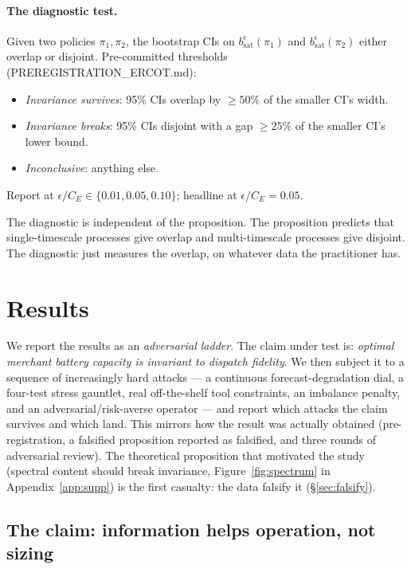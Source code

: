 \documentclass[11pt]{article}
\begin{document}
\paragraph{The diagnostic test.} Given two policies $\pi_1, \pi_2$, the bootstrap CIs on $b_{\mathrm{sat}}^\epsilon(\pi_1)$ and $b_{\mathrm{sat}}^\epsilon(\pi_2)$ either overlap or disjoint. Pre-committed thresholds (PREREGISTRATION\_ERCOT.md):

\begin{itemize}
\item \emph{Invariance survives}: 95\% CIs overlap by $\geq 50\%$ of the smaller CI's width.
\item \emph{Invariance breaks}: 95\% CIs disjoint with a gap $\geq 25\%$ of the smaller CI's lower bound.
\item \emph{Inconclusive}: anything else.
\end{itemize}

Report at $\epsilon / C_E \in \{0.01, 0.05, 0.10\}$; headline at $\epsilon / C_E = 0.05$.

The diagnostic is independent of the proposition. The proposition predicts that single-timescale processes give overlap and multi-timescale processes give disjoint. The diagnostic just measures the overlap, on whatever data the practitioner has.

\section{Results}\label{sec:results}

We report the results as an \emph{adversarial ladder}. The claim under
test is: \emph{optimal merchant battery capacity is invariant to dispatch
fidelity}. We then subject it to a sequence of increasingly hard attacks
--- a continuous forecast-degradation dial, a four-test stress gauntlet,
real off-the-shelf tool constraints, an imbalance penalty, and an
adversarial/risk-averse operator --- and report which attacks the claim
survives and which land. This mirrors how the result was actually
obtained (pre-registration, a falsified proposition reported as falsified,
and three rounds of adversarial review). The theoretical proposition that
motivated the study (spectral content should break invariance,
Figure~\ref{fig:spectrum} in Appendix~\ref{app:supp}) is the first
casualty: the data falsify it (\S\ref{sec:falsify}).

\subsection{The claim: information helps operation, not sizing}
\end{document}
